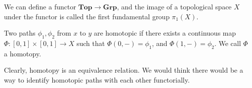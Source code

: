 We can define a functor $\mathbf{Top} \to \mathbf{Grp} $, and the image of a topological space $X$ under the functor is called the first fundamental group $\pi _1(X)$.
\begin{definition}[Homotopic]\label{dfn:6.1}
	Two paths $\phi _1,\phi _2$ from $x$ to $y$ are homotopic if there exists a continuous map $\Phi : [0,1]\times [0,1] \to X$ such that  $\Phi (0,-)=\phi _1$, and $\Phi (1,-)=\phi _2$. We call $\Phi $ a homotopy.
\end{definition}

Clearly, homotopy is an equivalence relation. We would think there would be a way to identify homotopic paths with each other functorially.
